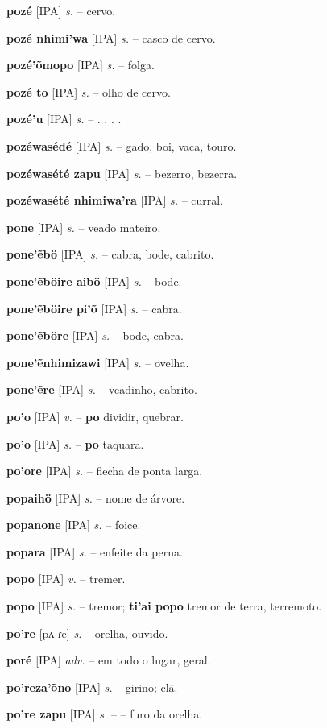 \textbf{pozé} [IPA] \textit{s.} -- cervo.

\textbf{pozé nhimi'wa} [IPA] \textit{s.} -- casco de cervo.

\textbf{pozé'õmopo} [IPA] \textit{s.} -- folga.

\textbf{pozé to} [IPA] \textit{s.} -- olho de cervo.

\textbf{pozé'u} [IPA] \textit{s.} -- . . . .

\textbf{pozéwasédé} [IPA] \textit{s.} -- gado, boi, vaca, touro.

\textbf{pozéwasété zapu} [IPA] \textit{s.} -- bezerro, bezerra.

\textbf{pozéwasété nhimiwa'ra} [IPA] \textit{s.} -- curral.

\textbf{pone} [IPA] \textit{s.} -- veado mateiro.

\textbf{pone'ẽbö} [IPA] \textit{s.} -- cabra, bode, cabrito.

\textbf{pone'ẽböire aibö} [IPA] \textit{s.} -- bode.

\textbf{pone'ẽböire pi'õ} [IPA] \textit{s.} -- cabra.

\textbf{pone'ẽböre} [IPA] \textit{s.} -- bode, cabra.

\textbf{pone'ẽnhimizawi} [IPA] \textit{s.} -- ovelha.

\textbf{pone'ẽre} [IPA] \textit{s.} -- veadinho, cabrito.

\textbf{po'o} [IPA] \textit{v.} -- \textbf{po} dividir, quebrar.

\textbf{po'o} [IPA] \textit{s.} -- \textbf{po} taquara.

\textbf{po'ore} [IPA] \textit{s.} -- flecha de ponta larga.

\textbf{popaihö} [IPA] \textit{s.} -- nome de árvore.

\textbf{popanone} [IPA] \textit{s.} -- foice.

\textbf{popara} [IPA] \textit{s.} -- enfeite da perna.

\textbf{popo} [IPA] \textit{v.} -- tremer.

\textbf{popo} [IPA] \textit{s.} -- tremor; \textbf{ti'ai popo} tremor de terra, terremoto.

\textbf{po're} [pʌˈɾe] \textit{s.} -- orelha, ouvido.

\textbf{poré} [IPA] \textit{adv.} -- em todo o lugar, geral.

\textbf{po'reza'õno} [IPA] \textit{s.} -- girino; clã.

\textbf{po're zapu} [IPA] \textit{s.} -- -- furo da orelha.

